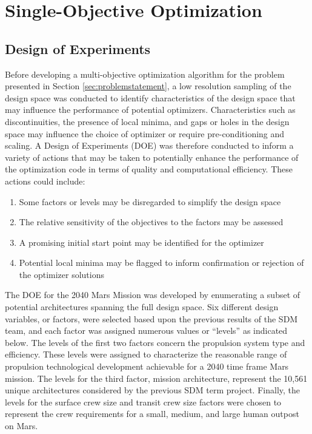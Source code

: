 \documentclass[]{aiaa-pretty}
\begin{document}
\section{Single-Objective Optimization}
\label{sec:single}

\subsection{Design of Experiments}
\label{sec:DOE}
Before developing a multi-objective optimization algorithm for the problem presented in Section \ref{sec:problemstatement}, a low resolution sampling of the design space was conducted to identify characteristics of the design space that may influence the performance of potential optimizers. Characteristics such as discontinuities, the presence of local minima, and gaps or holes in the design space may influence the choice of optimizer or require pre-conditioning and scaling. A Design of Experiments (DOE) was therefore conducted to inform a variety of actions that may be taken to potentially enhance the performance of the optimization code in terms of quality and computational efficiency. These actions could include: 

\begin{enumerate}
\item Some factors or levels may be disregarded to simplify the design space
\item The relative sensitivity of the objectives to the factors may be assessed
\item A promising initial start point may be identified for the optimizer
\item Potential local minima may be flagged to inform confirmation or rejection of the optimizer solutions
\end{enumerate}

The DOE for the 2040 Mars Mission was developed by enumerating a subset of potential architectures spanning the full design space. Six different design variables, or factors, were selected based upon the previous results of the SDM team, and each factor was assigned numerous values or ``levels'' as indicated below. The levels of the first two factors concern the propulsion system type and efficiency. These levels were assigned to characterize the reasonable range of propulsion technological development achievable for a 2040 time frame Mars mission. The levels for the third factor, mission architecture, represent the 10,561 unique architectures considered by the previous SDM term project. Finally, the levels for the surface crew size and transit crew size factors were chosen to represent the crew requirements for a small, medium, and large human outpost on Mars.
\end{document}
